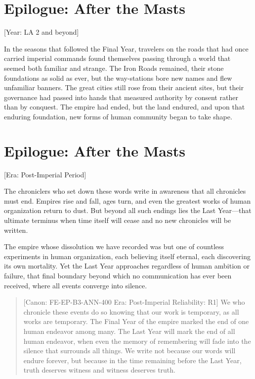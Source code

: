 \section{Epilogue: After the Masts}\label{epilogue-after-the-masts}

{[}Year: LA 2 and beyond{]}

In the seasons that followed the Final Year, travelers on the roads that
had once carried imperial commands found themselves passing through a
world that seemed both familiar and strange. The Iron Roads remained,
their stone foundations as solid as ever, but the way-stations bore new
names and flew unfamiliar banners. The great cities still rose from
their ancient sites, but their governance had passed into hands that
measured authority by consent rather than by conquest. The empire had
ended, but the land endured, and upon that enduring foundation, new
forms of human community began to take shape.

\section{Epilogue: After the Masts}\label{epilogue-after-the-masts-1}

{[}Era: Post-Imperial Period{]}

The chroniclers who set down these words write in awareness that all
chronicles must end. Empires rise and fall, ages turn, and even the
greatest works of human organization return to dust. But beyond all such
endings lies the Last Year---that ultimate terminus when time itself
will cease and no new chronicles will be written.

The empire whose dissolution we have recorded was but one of countless
experiments in human organization, each believing itself eternal, each
discovering its own mortality. Yet the Last Year approaches regardless
of human ambition or failure, that final boundary beyond which no
communication has ever been received, where all events converge into
silence.

\begin{quote}
{[}Canon: FE-EP-B3-ANN-400 \textbar{} Era: Post-Imperial \textbar{}
Reliability: R1{]} We who chronicle these events do so knowing that our
work is temporary, as all works are temporary. The Final Year of the
empire marked the end of one human endeavor among many. The Last Year
will mark the end of all human endeavor, when even the memory of
remembering will fade into the silence that surrounds all things. We
write not because our words will endure forever, but because in the time
remaining before the Last Year, truth deserves witness and witness
deserves truth.
\end{quote}

